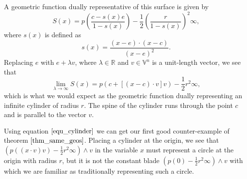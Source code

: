 \documentclass[12pt]{article}
\newcommand{\V}{\mathbb{V}}
\newcommand{\R}{\mathbb{R}}
\newcommand{\nvai}{\infty}
\begin{document}
A geometric function dually representative of this surface is given by
\begin{equation*}
S(x) = p\left(\frac{c-s(x)e}{1-s(x)}\right)-\frac{1}{2}\left(\frac{r}{1-s(x)}\right)^2\nvai,
\end{equation*}
where $s(x)$ is defined as
\begin{equation*}
s(x) = \frac{(x-e)\cdot(x-c)}{(x-e)^2}.
\end{equation*}
Replacing $e$ with $e+\lambda v$, where $\lambda\in\R$ and $v\in\V^n$ is a unit-length vector,
we see that
\begin{equation}\label{equ_cylinder}
\lim_{\lambda\to\infty} S(x) = p(c+[(x-c)\cdot v]v)-\frac{1}{2}r^2\nvai,
\end{equation}
which is what we would expect as the geometric function dually representing an infinite cylinder
of radius $r$.  The spine of the cylinder runs through the point $c$ and is parallel
to the vector $v$.

Using equation $\eqref{equ_cylinder}$ we can get our first good counter-example
of theorem $\eqref{thm_same_geos}$.  Placing a cylinder at the origin, we
see that $(p((x\cdot v)v)-\frac{1}{2}r^2\nvai)\wedge v$ in the variable
$x$ must represent a circle at the origin with radius $r$, but it is not the constant blade
$(p(0)-\frac{1}{2}r^2\nvai)\wedge v$ with which we are familiar as traditionally representing
such a circle.
\end{document}
